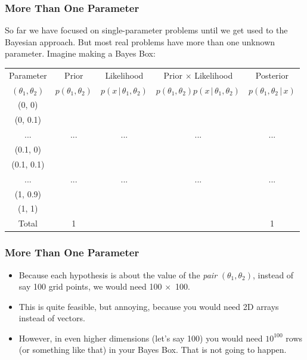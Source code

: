 \documentclass{beamer}
\newcommand{\given}{\,|\,}
\begin{document}
\begin{frame}
\frametitle{More Than One Parameter}
So far we have focused on single-parameter problems until we get used to the
Bayesian approach. But most real problems have more than one unknown parameter.
Imagine making a Bayes Box:
\begin{center}
{\tiny
\begin{tabular}{|c|c|c|c|c|}
\hline
Parameter & Prior & Likelihood & Prior $\times$ Likelihood & Posterior \\
$(\theta_1, \theta_2)$  & $p(\theta_1, \theta_2)$ & $p(x \given \theta_1, \theta_2)$ & $p(\theta_1, \theta_2)p(x\given\theta_1, \theta_2)$ & $p(\theta_1, \theta_2\given x)$ \\
\hline
(0, 0) &  &  & & \\
(0, 0.1) &  &  & & \\
... & ... & ... & ... & ... \\
(0.1, 0) &  &  & & \\
(0.1, 0.1) & & & & \\
... & ... & ... & ... & ... \\
(1, 0.9) & & & & \\
(1, 1) & & & & \\
\hline
Total & 1 & & & 1 \\
\hline
\end{tabular}
} %
\end{center}

\end{frame}

\begin{frame}
\frametitle{More Than One Parameter}
\begin{itemize}
\item Because each hypothesis is about the value of the {\em pair}
$(\theta_1, \theta_2)$, instead of say 100 grid points, we would need
100 $\times$~100. \pause
\item This is quite feasible, but annoying, because you would need 2D arrays
instead of vectors.\pause
\item However, in even higher dimensions (let's say 100) you would need
$10^{100}$ rows (or something like that) in your Bayes Box.
That is not going to happen.
\end{itemize}


\end{frame}
\end{document}
